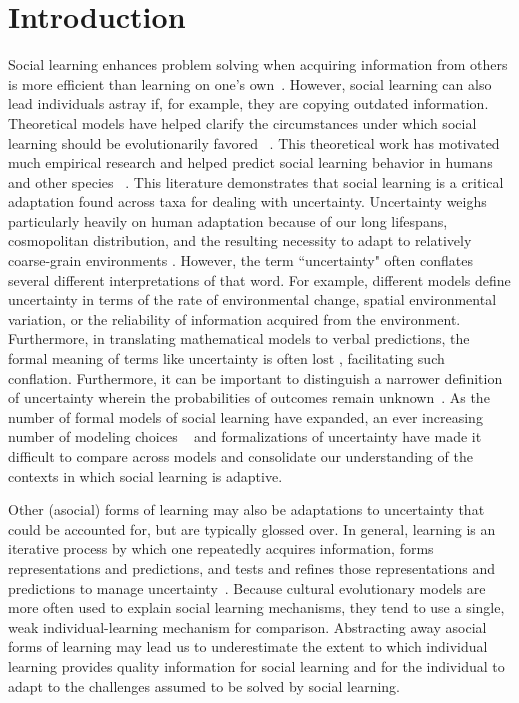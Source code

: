 \documentclass[letterpaper,11.5pt]{scrartcl}
\begin{document}
\section{Introduction}

Social learning enhances problem solving when acquiring information from others is more
efficient than learning on one's own~\cite{Laland2004}. However, social learning can also
lead individuals astray if, for example, they are copying outdated information.
Theoretical models have helped clarify the circumstances under which social learning
should be evolutionarily favored ~\cite{BoydRicherson1985}. This theoretical work has
motivated much empirical research and helped predict social learning behavior in humans
and other species ~\cite{McElreath2005,Kendal2018,Allen2019}.  This literature
demonstrates that social learning is a critical adaptation found across taxa for dealing
with uncertainty.  Uncertainty weighs particularly heavily on human adaptation because of
our long lifespans, cosmopolitan distribution, and the resulting necessity to adapt to
relatively coarse-grain environments \cite{levins1962}. However, the term ``uncertainty"
often conflates several different interpretations of that word. For example, different
models define uncertainty in terms of the rate of environmental change, spatial
environmental variation, or the reliability of information acquired from the environment.
Furthermore, in translating mathematical models to verbal predictions, the formal meaning
of terms like uncertainty is often lost \cite{lawson1988probability}, facilitating such
conflation. Furthermore, it can be important to distinguish a narrower definition of
uncertainty wherein the probabilities of outcomes remain unknown~\cite{knight1921,
volz2012}. As the number of formal models of social learning have expanded, an ever
increasing number of modeling choices ~\cite[Figure 1]{Kendal2018} and formalizations of
uncertainty have made it difficult to compare across models and consolidate our
understanding of the contexts in which social learning is adaptive. 

Other (asocial) forms of learning may also be adaptations to uncertainty that could be
accounted for, but are typically glossed over.  In general, learning is an iterative
process by which one repeatedly acquires information, forms representations and
predictions, and tests and refines those representations and predictions to manage
uncertainty~\cite{jacobs2011bayesian,clark2013whatever}.  Because cultural evolutionary
models are more often used to explain social learning mechanisms, they tend to use a
single, weak individual-learning mechanism for comparison. Abstracting away asocial forms
of learning may lead us to underestimate the extent to which individual learning provides
quality information for social learning and for the individual to adapt to the challenges
assumed to be solved by social learning. 
\end{document}
